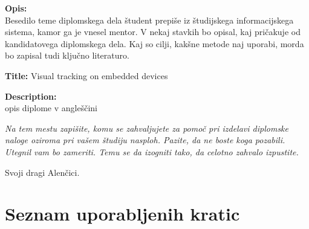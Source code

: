 \documentclass[a4paper,12pt,openright]{book}
\newcommand{\clearemptydoublepage}{\newpage{\pagestyle{empty}\cleardoublepage}}
\begin{document}
\bigskip
\noindent\textbf{Opis:}\\
Besedilo teme diplomskega dela študent prepiše iz študijskega informacijskega sistema, kamor ga je vnesel mentor.
V nekaj stavkih bo opisal, kaj pričakuje od kandidatovega diplomskega dela.
Kaj so cilji, kakšne metode naj uporabi, morda bo zapisal tudi ključno literaturo.

\bigskip
\noindent\textbf{Title:} Visual tracking on embedded devices

\bigskip
\noindent\textbf{Description:}\\
opis diplome v angleščini

\vfill



\vspace{2cm}

\clearemptydoublepage

\thispagestyle{empty}\mbox{}\vfill\null\it%
\noindent
Na tem mestu zapišite, komu se zahvaljujete za pomoč pri izdelavi diplomske naloge oziroma pri vašem študiju nasploh. Pazite, da ne boste koga pozabili. Utegnil vam bo zameriti. Temu se da izogniti tako, da celotno zahvalo izpustite.
\rm\normalfont

\clearemptydoublepage

\thispagestyle{empty}\mbox{}{\textheight}\mbox{}\hfill\begin{minipage}{0.55\textwidth}%
    Svoji dragi Alenčici.
    \normalfont\end{minipage}

\clearemptydoublepage


\pagestyle{empty}
\def\thepage{}%
\tableofcontents{}


\clearemptydoublepage


\chapter*{Seznam uporabljenih kratic}
\end{document}
